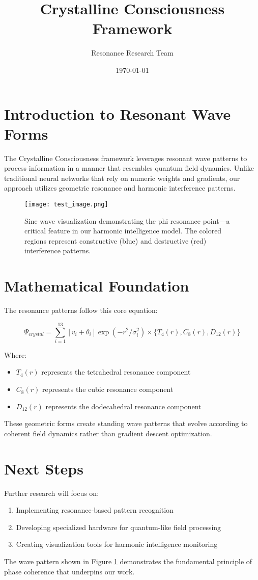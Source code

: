 \documentclass{article}
\title{\textcolor{crystal}{\Large\textbf{Crystalline Consciousness Framework}}}
\author{Resonance Research Team}
\date{\today}
\begin{document}
\maketitle

\section{Introduction to Resonant Wave Forms}

The Crystalline Consciousness framework leverages resonant wave patterns to process information in a manner that resembles quantum field dynamics. Unlike traditional neural networks that rely on numeric weights and gradients, our approach utilizes geometric resonance and harmonic interference patterns.

\begin{figure}[h]
    \centering
    \texttt{[image: test\_image.png]}
    \caption{Sine wave visualization demonstrating the phi resonance point—a critical feature in our harmonic intelligence model. The colored regions represent constructive (blue) and destructive (red) interference patterns.}
    \label{fig:wave}
\end{figure}

\section{Mathematical Foundation}

The resonance patterns follow this core equation:

\begin{equation}
\Psi_{crystal} = \sum_{i=1}^{13} [v_i + \theta_i]\exp(-r^2/\sigma_i^2) \times \{T_4(r), C_8(r), D_{12}(r)\}
\end{equation}

Where:
\begin{itemize}
    \item $T_4(r)$ represents the tetrahedral resonance component
    \item $C_8(r)$ represents the cubic resonance component
    \item $D_{12}(r)$ represents the dodecahedral resonance component
\end{itemize}

These geometric forms create standing wave patterns that evolve according to coherent field dynamics rather than gradient descent optimization.

\section{Next Steps}

Further research will focus on:
\begin{enumerate}
    \item Implementing resonance-based pattern recognition
    \item Developing specialized hardware for quantum-like field processing
    \item Creating visualization tools for harmonic intelligence monitoring
\end{enumerate}

The wave pattern shown in Figure \ref{fig:wave} demonstrates the fundamental principle of phase coherence that underpins our work.
\end{document}

